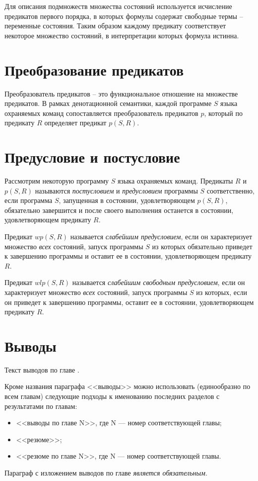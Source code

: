 Для описания подмножеств множества состояний используется 
исчисление предикатов первого порядка, в которых формулы содержат свободные термы -- 
переменные состояния. Таким образом каждому предикату соответствует некоторое множество состояний,
в интерпретации которых формула истинна.

\section{Преобразование предикатов}
Преобразователь предикатов -- это функциональное отношение на множестве предикатов.
В рамках денотационной семантики, каждой программе $S$ языка охраняемых
команд сопоставляется преобразователь предикатов $p$, который по предикату
$R$ определяет предикат $p(S, R)$.

\section{Предусловие и постусловие}
Рассмотрим некоторую программу $S$ языка охраняемых команд. Предикаты $R$ и $p(S, R)$ 
называются \textit{постусловием} и \textit{предусловием} программы $S$ соответственно, 
если программа $S$, запущенная в состоянии, удовлетворяющем $p(S,R)$, 
обязательно завершится и после своего выполнения останется в состоянии,
удовлетворяющем предикату $R$.

Предикат $wp(S, R)$ называется \textit{слабейшим предусловием}, если он 
характеризует множество \textit{всех} состояний, запуск программы $S$ из которых
обязательно приведет к завершению программы и оставит ее в состоянии,
удовлетворяющем предикату $R$.

Предикат $wlp(S, R)$ называется \textit{слабейшим свободным предусловием}, если он 
характеризует множество \textit{всех} состояний, запуск программы $S$ из которых,
если он приведет к завершению программы, оставит ее в состоянии, удовлетворяющем предикату $R$.

\section{Выводы} \label{ch1:conclusion}
Текст выводов по главе \thechapter.

Кроме названия параграфа <<выводы>> можно использовать (единообразно по всем главам) следующие подходы к именованию последних разделов с результатами по главам:
\begin{itemize}
	\item <<выводы по главе N>>, где N --- номер соответствующей главы;
	\item <<резюме>>;
	\item <<резюме по главе N>>, где N --- номер соответствующей главы.
\end{itemize}

Параграф с изложением выводов по главе \textit{является обязательным}.

%
